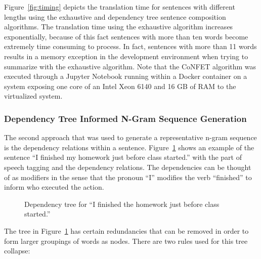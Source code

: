 \documentclass{article}[10]
\begin{document}
Figure~\ref{fig:timing} depicts the translation time for sentences with
different lengths using the exhaustive and dependency tree sentence composition
algorithms. The translation time using the exhaustive algorithm increases exponentially, because of this fact sentences with more than ten words become extremely time consuming to process. In fact, sentences with
more than 11 words results in a memory exception in the development environment
when trying to summarize with the exhaustive algorithm. Note that the CoNFET
algorithm was executed through a Jupyter Notebook running within a Docker
container on a system exposing one core of an Intel Xeon 6140 and 16 GB of RAM
to the virtualized system.

\subsubsection{Dependency Tree Informed N-Gram Sequence
  Generation\label{sec:dependency}}

The second approach that was used to generate a representative n-gram sequence
is the dependency relations within a sentence. Figure~\ref{fig:dep} shows an
example of the sentence ``I finished my homework just before class started.''
with the part of speech tagging and the dependency relations. The dependencies
can be thought of as modifiers in the sense that the pronoun ``I'' modifies the
verb ``finished'' to inform who executed the action.

\begin{figure}[H]
  \begin{center}
    \caption{Dependency tree for ``I finished the homework just before class
      started.''\label{fig:dep}}
  \end{center}
\end{figure}

The tree in Figure~\ref{fig:dep} has certain redundancies that can be removed in
order to form larger groupings of words as nodes. There are two rules used for
this tree collapse:
\end{document}
